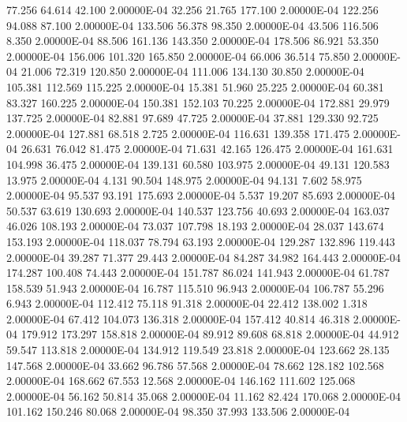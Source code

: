     77.256    64.614    42.100  2.00000E-04
    32.256    21.765   177.100  2.00000E-04
   122.256    94.088    87.100  2.00000E-04
   133.506    56.378    98.350  2.00000E-04
    43.506   116.506     8.350  2.00000E-04
    88.506   161.136   143.350  2.00000E-04
   178.506    86.921    53.350  2.00000E-04
   156.006   101.320   165.850  2.00000E-04
    66.006    36.514    75.850  2.00000E-04
    21.006    72.319   120.850  2.00000E-04
   111.006   134.130    30.850  2.00000E-04
   105.381   112.569   115.225  2.00000E-04
    15.381    51.960    25.225  2.00000E-04
    60.381    83.327   160.225  2.00000E-04
   150.381   152.103    70.225  2.00000E-04
   172.881    29.979   137.725  2.00000E-04
    82.881    97.689    47.725  2.00000E-04
    37.881   129.330    92.725  2.00000E-04
   127.881    68.518     2.725  2.00000E-04
   116.631   139.358   171.475  2.00000E-04
    26.631    76.042    81.475  2.00000E-04
    71.631    42.165   126.475  2.00000E-04
   161.631   104.998    36.475  2.00000E-04
   139.131    60.580   103.975  2.00000E-04
    49.131   120.583    13.975  2.00000E-04
     4.131    90.504   148.975  2.00000E-04
    94.131     7.602    58.975  2.00000E-04
    95.537    93.191   175.693  2.00000E-04
     5.537    19.207    85.693  2.00000E-04
    50.537    63.619   130.693  2.00000E-04
   140.537   123.756    40.693  2.00000E-04
   163.037    46.026   108.193  2.00000E-04
    73.037   107.798    18.193  2.00000E-04
    28.037   143.674   153.193  2.00000E-04
   118.037    78.794    63.193  2.00000E-04
   129.287   132.896   119.443  2.00000E-04
    39.287    71.377    29.443  2.00000E-04
    84.287    34.982   164.443  2.00000E-04
   174.287   100.408    74.443  2.00000E-04
   151.787    86.024   141.943  2.00000E-04
    61.787   158.539    51.943  2.00000E-04
    16.787   115.510    96.943  2.00000E-04
   106.787    55.296     6.943  2.00000E-04
   112.412    75.118    91.318  2.00000E-04
    22.412   138.002     1.318  2.00000E-04
    67.412   104.073   136.318  2.00000E-04
   157.412    40.814    46.318  2.00000E-04
   179.912   173.297   158.818  2.00000E-04
    89.912    89.608    68.818  2.00000E-04
    44.912    59.547   113.818  2.00000E-04
   134.912   119.549    23.818  2.00000E-04
   123.662    28.135   147.568  2.00000E-04
    33.662    96.786    57.568  2.00000E-04
    78.662   128.182   102.568  2.00000E-04
   168.662    67.553    12.568  2.00000E-04
   146.162   111.602   125.068  2.00000E-04
    56.162    50.814    35.068  2.00000E-04
    11.162    82.424   170.068  2.00000E-04
   101.162   150.246    80.068  2.00000E-04
    98.350    37.993   133.506  2.00000E-04
